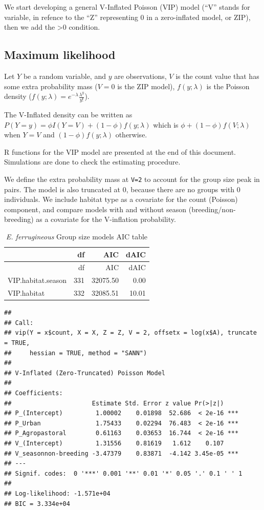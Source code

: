 \documentclass[]{article}
\begin{document}
We start developing a general V-Inflated Poisson (VIP) model (``V''
stands for variable, in refence to the ``Z'' representing 0 in a
zero-inflated model, or ZIP), then we add the \textgreater{}0 condition.

\subsection{Maximum likelihood}\label{maximum-likelihood}

Let \(Y\) be a random variable, and \(y\) are observations, \(V\) is the
count value that has some extra probability mass (\(V=0\) is the ZIP
model), \(f(y; \lambda)\) is the Poisson density
(\(f(y; \lambda) = e^{-\lambda} \frac{\lambda^{y}}{y!}\)).

The V-Inflated density can be written as
\(P(Y=y) = \phi I(Y=V) + (1-\phi) f(y; \lambda)\) which is
\(\phi + (1-\phi) f(V; \lambda)\) when \(Y=V\) and
\((1-\phi) f(y; \lambda)\) otherwise.

R functions for the VIP model are presented at the end of this document.
Simulations are done to check the estimating procedure.

We define the extra probability mass at \texttt{V=2} to account for the
group size peak in pairs. The model is also truncated at 0, because
there are no groups with 0 individuals. We include habitat type as a
covariate for the count (Poisson) component, and compare models with and
without season (breeding/non-breeding) as a covariate for the
V-inflation probability.

\begin{longtable}[]{@{}lrrr@{}}
\caption{\textit{E. ferrugineous} Group size models AIC
table}\tabularnewline
\toprule
& df & AIC & dAIC\tabularnewline
\midrule
\endfirsthead
\toprule
& df & AIC & dAIC\tabularnewline
\midrule
\endhead
VIP.habitat.season & 331 & 32075.50 & 0.00\tabularnewline
VIP.habitat & 332 & 32085.51 & 10.01\tabularnewline
\bottomrule
\end{longtable}

\begin{verbatim}
## 
## Call:
## vip(Y = x$count, X = X, Z = Z, V = 2, offsetx = log(x$A), truncate = TRUE, 
##     hessian = TRUE, method = "SANN")
## 
## V-Inflated (Zero-Truncated) Poisson Model
## 
## Coefficients:
##                      Estimate Std. Error z value Pr(>|z|)    
## P_(Intercept)         1.00002    0.01898  52.686  < 2e-16 ***
## P_Urban               1.75433    0.02294  76.483  < 2e-16 ***
## P_Agropastoral        0.61163    0.03653  16.744  < 2e-16 ***
## V_(Intercept)         1.31556    0.81619   1.612    0.107    
## V_seasonnon-breeding -3.47379    0.83871  -4.142 3.45e-05 ***
## ---
## Signif. codes:  0 '***' 0.001 '**' 0.01 '*' 0.05 '.' 0.1 ' ' 1 
## 
## Log-likelihood: -1.571e+04 
## BIC = 3.334e+04
\end{verbatim}
\end{document}
